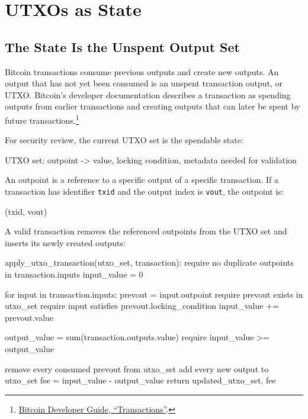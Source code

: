 \section{UTXOs as State}

\subsection{The State Is the Unspent Output Set}

Bitcoin transactions consume previous outputs and create new outputs. An output that has not yet been consumed is an unspent transaction output, or UTXO. Bitcoin's developer documentation describes a transaction as spending outputs from earlier transactions and creating outputs that can later be spent by future transactions.\footnote{\href{https://developer.bitcoin.org/devguide/transactions.html}{Bitcoin Developer Guide, ``Transactions''}.}

For security review, the current UTXO set is the spendable state:

\begin{codeblock}
UTXO set:
    outpoint -> {
        value,
        locking condition,
        metadata needed for validation
    }
\end{codeblock}

An outpoint is a reference to a specific output of a specific transaction. If a transaction has identifier \texttt{txid} and the output index is \texttt{vout}, the outpoint is:

\begin{codeblock}
(txid, vout)
\end{codeblock}

A valid transaction removes the referenced outpoints from the UTXO set and inserts its newly created outputs:

\begin{codeblock}
apply_utxo_transaction(utxo_set, transaction):
    require no duplicate outpoints in transaction.inputs
    input_value = 0

    for input in transaction.inputs:
        prevout = input.outpoint
        require prevout exists in utxo_set
        require input satisfies prevout.locking_condition
        input_value += prevout.value

    output_value = sum(transaction.outputs.value)
    require input_value >= output_value

    remove every consumed prevout from utxo_set
    add every new output to utxo_set
    fee = input_value - output_value
    return updated_utxo_set, fee
\end{codeblock}

